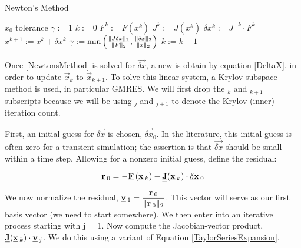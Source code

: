 \begin{algo}
\setlength{\baselineskip}{0.625\baselineskip}
\caption{Newton's Method}
\begin{algorithmic}[1]
\Define $x_0$
\Define tolerance
\State $\gamma := 1$
\State $k := 0$
    \State $F^k := F(x^k)$ 
    \State $J^k := J(x^k)$ 
    \State $\delta x^k := J^{-k} \cdot F^k$ 
    \State $x^{k+1} := x^k + \delta x^k$ 
    \State $\gamma := \text{min}\left(\frac{\norm{J \delta x}{2}}{\norm{F}{2}},\frac{\norm{\delta x}{2}}{\norm{x}{2}}\right)$ 
    \State $k := k + 1$ 
\EndWhile
\end{algorithmic}
\end{algo}


Once \eqref{NewtonsMethod} is solved for $\Vec{\delta x}$, a new  is obtain by equation \eqref{DeltaX}. in order to update $\Vec{x}_k$ to $\Vec{x}_{k+1}$. 
To solve this linear system, a Krylov subspace method is used, in particular GMRES.
We will first drop the $_k$ and $_{k+1}$ subscripts because we will be using $_j$ and $_{j+1}$ to denote the Krylov (inner) iteration count.

First, an initial guess for $\Vec{\delta x}$ is chosen, $\Vec{\delta x}_0$.
In the literature, this initial guess is often zero for a transient simulation; the assertion is that $\Vec{\delta x}$ should be small within a time step.
Allowing for a nonzero initial guess, define the residual:

\begin{equation}
\Vec{r}_0 = -\Vec{F}(\Vec{x}_k)-\Mat{J}(\Vec{x}_k)\cdot\Vec{\delta x}_0
\end{equation}

We now normalize the residual, $\displaystyle \Vec{v}_1 = \frac{\Vec{r}_0}{\norm{\Vec{r}_0}{2}}$.
This vector will serve as our first basis vector (we need to start somewhere).
We then enter into an iterative process starting with j = 1.
Now compute the Jacobian-vector product, $\Mat{J}(\Vec{x}_k)\cdot\Vec{v}_j$.
We do this using a variant of Equation \eqref{TaylorSeriesExpansion}.

